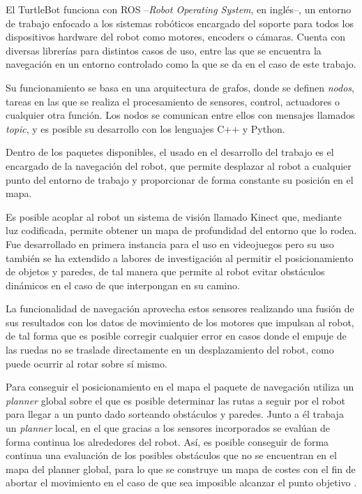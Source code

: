 El TurtleBot funciona con ROS --\textit{Robot Operating System}, en inglés--,\cite{ROSDoc} un entorno de trabajo enfocado a los sistemas robóticos encargado del soporte para todos los dispositivos hardware del robot como motores, encoders o cámaras. 
Cuenta con diversas librerías para distintos casos de uso, entre las que se encuentra la navegación en un entorno controlado como la que se da en el caso de este trabajo.

Su funcionamiento se basa en una arquitectura de grafos, donde se definen \textit{nodos}, tareas en las que se realiza el procesamiento de sensores, control, actuadores o cualquier otra función.
Los nodos se comunican entre ellos con mensajes llamados \textit{topic}, y es posible su desarrollo con los lenguajes C++ y Python.

Dentro de los paquetes disponibles, el usado en el desarrollo del trabajo es el encargado de la navegación del robot, que permite desplazar al robot a cualquier punto del entorno de trabajo y proporcionar de forma constante su posición en el mapa.

Es posible acoplar al robot un sistema de visión llamado Kinect que, mediante luz codificada, permite obtener un mapa de profundidad del entorno que lo rodea.
Fue desarrollado en primera instancia para el uso en videojuegos pero su uso también se ha extendido a labores de investigación al permitir el posicionamiento de objetos y paredes, de tal manera que permite al robot evitar obstáculos dinámicos en el caso de que interpongan en su camino.

La funcionalidad de navegación aprovecha estos sensores realizando una fusión de sus resultados con los datos de movimiento de los motores que impulsan al robot, de tal forma que es posible corregir cualquier error en casos donde el empuje de las ruedas no se traslade directamente en un desplazamiento del robot, como puede ocurrir al rotar sobre sí mismo.

Para conseguir el posicionamiento en el mapa el paquete de navegación utiliza un \textit{planner} global sobre el que es posible determinar las rutas a seguir por el robot para llegar a un punto dado sorteando obstáculos y paredes.
Junto a él trabaja un \textit{planner} local, en el que gracias a los sensores incorporados se evalúan de forma continua los alrededores del robot.
Así, es posible conseguir de forma continua una evaluación de los posibles obstáculos que no se encuentran en el mapa del planner global, para lo que se construye un mapa de costes con el fin de abortar el movimiento en el caso de que sea imposible alcanzar el punto objetivo \cite{ROSDoc}.

